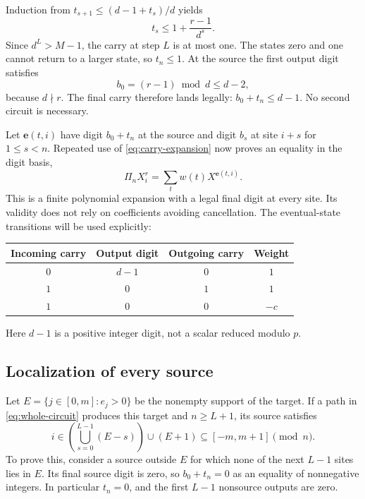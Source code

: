 Induction from $t_{s+1}\le(d-1+t_s)/d$ yields
\begin{equation}
 t_s\le1+\frac{r-1}{d^s}.
 \label{eq:carry-bound}
\end{equation}
Since $d^L>M-1$, the carry at step $L$ is at most one.
The states zero and one cannot return to a larger state, so
$t_n\le1$. At the source the first output digit satisfies
\[
 b_0=(r-1)\bmod d\le d-2,
\]
because $d\nmid r$. The final carry therefore lands legally:
$b_0+t_n\le d-1$. No second circuit is necessary.

Let $\mathbf e(t,i)$ have digit $b_0+t_n$ at the source and
digit $b_s$ at site $i+s$ for $1\le s<n$. Repeated use of
\eqref{eq:carry-expansion} now proves an equality in the digit basis,
\begin{equation}
 \Pi_nX_i^r=\sum_t w(t)X^{\mathbf e(t,i)}.
 \label{eq:whole-circuit}
\end{equation}
This is a finite polynomial expansion with a legal final digit
at every site. Its validity does not rely on coefficients avoiding
cancellation. The eventual-state transitions will be used explicitly:
\begin{center}
\begin{tabular}{@{}cccc@{}}
\toprule
Incoming carry & Output digit & Outgoing carry & Weight\\
\midrule
$0$ & $d-1$ & $0$ & $1$\\
$1$ & $0$ & $1$ & $1$\\
$1$ & $0$ & $0$ & $-c$\\
\bottomrule
\end{tabular}
\end{center}
Here $d-1$ is a positive integer digit, not a scalar reduced modulo $p$.

\subsection{Localization of every source}

Let $E=\{j\in[0,m]:e_j>0\}$ be the nonempty support of the
target. If a path in \eqref{eq:whole-circuit} produces this target
and $n\ge L+1$, its source satisfies
\begin{equation}
 i\in\left(\bigcup_{s=0}^{L-1}(E-s)\right)\cup(E+1)
       \subseteq[-m,m+1]\pmod n.
 \label{eq:source-localization}
\end{equation}
To prove this, consider a source outside $E$ for which none of the
next $L-1$ sites lies in $E$. Its final source digit is zero, so
$b_0+t_n=0$ as an equality of nonnegative integers. In particular
$t_n=0$, and the first $L-1$ nonsource outputs are zero.

